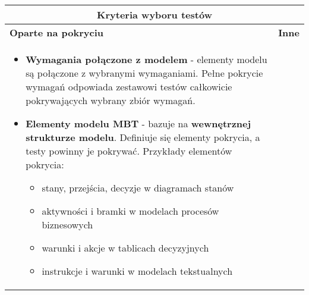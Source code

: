 \documentclass[../main.tex]{subfiles}
\begin{document}
    \begin{table}[H]
        \begin{center}
            \begin{tabular}{| p{8cm} | p{8cm} |}
                \hline
                \multicolumn{2}{|c|}{\textbf{Kryteria wyboru testów}}\\
                \hline
                \textbf{Oparte na pokryciu} & \textbf{Inne}\\
                \hline
                \begin{itemize}
                    \item \textbf{Wymagania połączone z modelem} - elementy modelu są połączone z wybranymi
                    wymaganiami. Pełne pokrycie wymagań odpowiada zestawowi testów całkowicie pokrywających wybrany zbiór wymagań.

                    \item \textbf{Elementy modelu MBT} - bazuje na \textbf{wewnętrznej strukturze modelu}. Definiuje się elementy
                    pokrycia, a testy powinny je pokrywać. Przykłady elementów pokrycia:
                    \begin{itemize}
                        \item stany, przejścia, decyzje w diagramach stanów
                        \item aktywności i bramki w modelach procesów biznesowych
                        \item warunki i akcje w tablicach decyzyjnych
                        \item instrukcje i warunki w modelach tekstualnych
                    \end{itemize}


\end{itemize}
\end{tabular}
\end{center}
\end{table}
\end{document}
